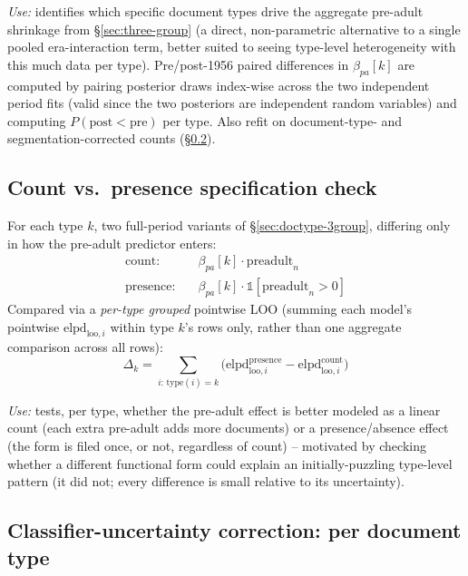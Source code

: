 \textit{Use:} identifies which specific document types drive the aggregate
pre-adult shrinkage from \S\ref{sec:three-group} (a direct, non-parametric
alternative to a single pooled era-interaction term, better suited to seeing
type-level heterogeneity with this much data per type). Pre/post-1956
paired differences in $\beta_{pa}[k]$ are computed by pairing posterior
draws index-wise across the two independent period fits (valid since the two
posteriors are independent random variables) and computing $P(\text{post} <
\text{pre})$ per type. Also refit on document-type- and segmentation-corrected
counts (\S\ref{sec:doctype-uncertainty}).

\subsection{Count vs.\ presence specification check}
\label{sec:count-presence}

For each type $k$, two full-period variants of \S\ref{sec:doctype-3group},
differing only in how the pre-adult predictor enters:
\begin{align}
  \text{count:}\quad & \beta_{pa}[k]\cdot\text{preadult}_n \\
  \text{presence:}\quad & \beta_{pa}[k]\cdot \mathbb{1}[\text{preadult}_n>0]
\end{align}
Compared via a \emph{per-type grouped} pointwise LOO (summing each model's
pointwise $\mathrm{elpd}_{\text{loo},i}$ within type $k$'s rows only, rather
than one aggregate comparison across all rows):
\begin{equation}
  \Delta_k = \sum_{i:\,\text{type}(i)=k} \bigl(\mathrm{elpd}_{\text{loo},i}^{\text{presence}} - \mathrm{elpd}_{\text{loo},i}^{\text{count}}\bigr)
\end{equation}

\textit{Use:} tests, per type, whether the pre-adult effect is better
modeled as a linear count (each extra pre-adult adds more documents) or a
presence/absence effect (the form is filed once, or not, regardless of
count) -- motivated by checking whether a different functional form could
explain an initially-puzzling type-level pattern (it did not; every
difference is small relative to its uncertainty).

\subsection{Classifier-uncertainty correction: per document type}
\label{sec:doctype-uncertainty}

